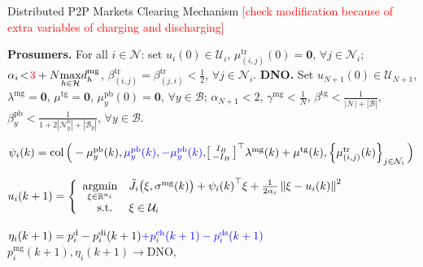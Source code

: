 \documentclass{IEEEtran}  %
\newcommand{\mc}{\mathcal}
\newcommand{\bb}{\mathbb}
\newcommand{\R}{\bb R}
\newcommand{\red}{\textcolor{red}}
\newcommand{\argmin}{\operatorname{argmin}}
\newcommand{\col}{\operatorname{col}}
\newcommand{\0}{\mathbf{0}}
\newcommand{\1}{\mathbf{1}}
\newcommand{\edit}[1]{\color{blue}{#1}\color{black}}
\begin{document}
\begin{algorithm*}[htbp]
\caption{Distributed P2P Markets Clearing Mechanism \red{[check modification because of extra variables of charging and discharging]}}
\label{alg:alg1}
\begin{algorithmic}[1]
\small

\init{ }
\State
\textbf{Prosumers.} For all $i \in \mc N$: set $u_i(0) \in \mc U_i$, $\mu^{\text{tr}}_{(i,j)}(0) = \0$, $\forall j \in \mc N_i$; $\alpha_i \!<\! 
\red{3} +N \underset{h\in \mc H}{\max} d_h^{\text{mg}} $, $\beta^{\text{tr}}_{(i,j)}\! =\! \beta^{\text{tr}}_{ (j,i)} \!<\! \frac{1}{2}$, $\forall j \!\in\! \mc N_i$.
\State
\textbf{DNO.} Set $u_{N+1}(0) \!\in\! \mc U_{N+1}$, $\lambda^{\text{mg}}\!=\!\0$, $\mu^{\text{tg}} \!=\! \0$, $\mu_y^{\text{pb}}(0)\! = \!\0$, $\forall y \!\in\! \mc B$; $\alpha_{N+1} \!<\!2$, $\gamma^{\text{mg}} \!<\! \frac{1}{N}$, $\beta^{\text{tg}}\! <\! \frac{1}{|\mc N| \!+\! |\mc B|}$, $\beta_y^{\text{pb}} \!<\! \frac{1}{1\!+\!2|\mc N_y^{\mathrm{b}}|\!+\!|\mc B_y|}$,  $\forall y\!\in\! \mc B $.%

\Endinit

\smallskip
\IUC{ }
\smallskip
\ForAll{$ i \in \mc N$}
\PRO{ }
\Primal{ }

\smallskip
\State 
$\psi_i(k) = 
	\col \Big(-\mu_y^{\text{pb}}(k),\edit{\mu_y^{\text{pb}}(k), -\mu_y^{\text{pb}}(k),}
	{
	\left[
	\begin{smallmatrix}
	I_H\\
	- I_H 
	\end{smallmatrix}
	\right] 
	}^\top \lambda^{\text{mg}}(k) + \mu^{\text{tg}}(k),
	\left\{ {\mu^{\text{tr}}_{(i,j)}(k)}\right\}_{j \in \mc N_i}   \Big)$

\State
$u_i(k+1)   =
\left\{
\begin{array}{r l}
	\underset{\xi \in \R^{n_i}}{\argmin} & 
	\tilde J_{i} \big( \xi, \sigma^{\text{mg}}(k) \big) 
	+ {\psi_i(k)}^\top \xi + \frac{1}{2 \alpha_i}
	\left\| \xi - u_i(k) 
	\textstyle
	  \right\|^2 \\
	\text{s.t. } & \xi \in \mc U_i
\end{array} 
	\right.	$
\EndPrimal

\State $\eta_i(k+1)= p^{\text{d}}_i-p^{\text{di}}_i(k+1)\edit{+p^{\text{ch}}_i(k+1)- p^{\text{ds}}_i(k+1)}$
\State
$
p^{\textrm{mg}}_{i}(k+1), \eta_i(k+1)  \longrightarrow  \text{DNO,}
$
     \ForAll{prosumer $ j \in \mc N_i$}
     

\end{algorithmic}
\end{algorithm*}
\end{document}
